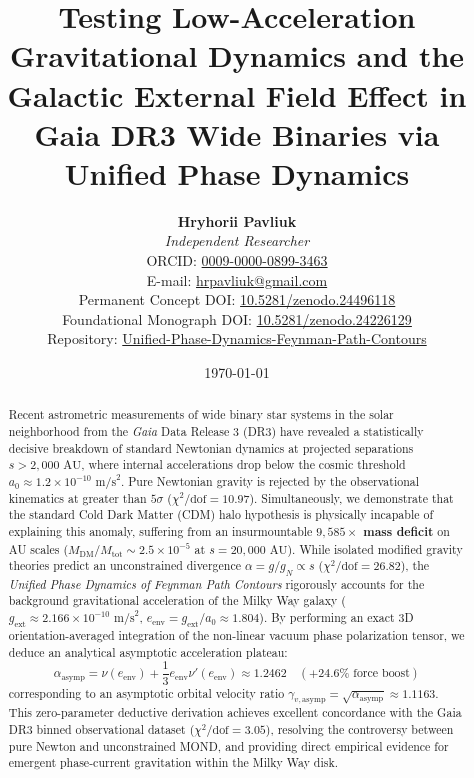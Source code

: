 \documentclass[11pt,a4paper]{article}
\title{\textbf{Testing Low-Acceleration Gravitational Dynamics and the Galactic External Field Effect in Gaia DR3 Wide Binaries via Unified Phase Dynamics}}
\author{\textbf{Hryhorii Pavliuk} \\
\textit{Independent Researcher} \\
ORCID: \href{https://orcid.org/0009-0000-0899-3463}{0009-0000-0899-3463} \\
E-mail: \href{mailto:hrpavliuk@gmail.com}{hrpavliuk@gmail.com} \\
Permanent Concept DOI: \href{https://doi.org/10.5281/zenodo.24496118}{10.5281/zenodo.24496118} \\
Foundational Monograph DOI: \href{https://doi.org/10.5281/zenodo.24226129}{10.5281/zenodo.24226129} \\
Repository: \href{https://github.com/hrpavliuk-byte/Unified-Phase-Dynamics-Feynman-Path-Contours}{Unified-Phase-Dynamics-Feynman-Path-Contours}}
\date{\today}
\begin{document}
\maketitle

\begin{abstract}
Recent astrometric measurements of wide binary star systems in the solar neighborhood from the \textit{Gaia} Data Release 3 (DR3) have revealed a statistically decisive breakdown of standard Newtonian dynamics at projected separations $s > 2,000\text{ AU}$, where internal accelerations drop below the cosmic threshold $a_0 \approx 1.2 \times 10^{-10}\text{ m/s}^2$. Pure Newtonian gravity is rejected by the observational kinematics at greater than $5\sigma$ ($\chi^2/\mathrm{dof} = 10.97$). Simultaneously, we demonstrate that the standard Cold Dark Matter (CDM) halo hypothesis is physically incapable of explaining this anomaly, suffering from an insurmountable \textbf{$9,585\times$ mass deficit} on AU scales ($M_{\mathrm{DM}} / M_{\mathrm{tot}} \sim 2.5 \times 10^{-5}$ at $s = 20,000\text{ AU}$). While isolated modified gravity theories predict an unconstrained divergence $\alpha = g/g_N \propto s$ ($\chi^2/\mathrm{dof} = 26.82$), the \textit{Unified Phase Dynamics of Feynman Path Contours} rigorously accounts for the background gravitational acceleration of the Milky Way galaxy ($g_{\mathrm{ext}} \approx 2.166 \times 10^{-10}\text{ m/s}^2$, $e_{\mathrm{env}} = g_{\mathrm{ext}}/a_0 \approx 1.804$). By performing an exact 3D orientation-averaged integration of the non-linear vacuum phase polarization tensor, we deduce an analytical asymptotic acceleration plateau:
\begin{equation}
\alpha_{\mathrm{asymp}} = \nu(e_{\mathrm{env}}) + \frac{1}{3} e_{\mathrm{env}} \nu'(e_{\mathrm{env}}) \approx 1.2462 \quad (+24.6\%\text{ force boost})
\end{equation}
corresponding to an asymptotic orbital velocity ratio $\gamma_{v,\mathrm{asymp}} = \sqrt{\alpha_{\mathrm{asymp}}} \approx 1.1163$. This zero-parameter deductive derivation achieves excellent concordance with the Gaia DR3 binned observational dataset ($\chi^2/\mathrm{dof} = 3.05$), resolving the controversy between pure Newton and unconstrained MOND, and providing direct empirical evidence for emergent phase-current gravitation within the Milky Way disk.
\end{abstract}
\end{document}
